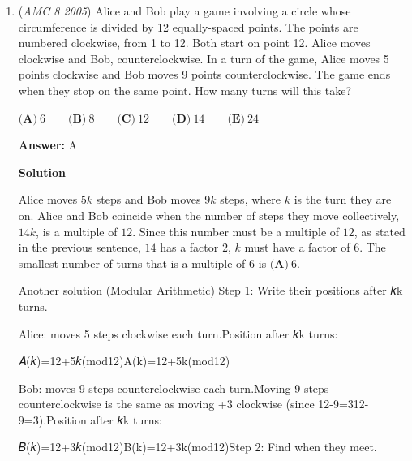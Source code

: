 \begin{enumerate}
$\textbf{(A)}\ 180\qquad\textbf{(B)}\ 188\qquad\textbf{(C)}\ 196\qquad\textbf{(D)}\ 200\qquad\textbf{(E)}\ 204$

 \textbf{Answer: }A



\textbf{Solution}

Draw altitudes from $B$ and $C$ to base $AD$ to create a rectangle and two right triangles. The side opposite $BC$ is equal to $50$. The bases of the right triangles can be found using Pythagorean or special triangles to be $18$ and $7$. Add it together to get $AD=18+50+7=75$. The perimeter is $75+30+50+25=\boxed{\textbf{(A)}\ 180}$.

 


	\item (\textit{AMC 8 2005}) Alice and Bob play a game involving a circle whose circumference is divided by 12 equally-spaced points. The points are numbered clockwise, from 1 to 12. Both start on point 12. Alice moves clockwise and Bob, counterclockwise.
In a turn of the game, Alice moves 5 points clockwise and Bob moves 9 points counterclockwise. The game ends when they stop on the same point. How many turns will this take?


 $\textbf{(A)}\ 6\qquad\textbf{(B)}\ 8\qquad\textbf{(C)}\ 12\qquad\textbf{(D)}\ 14\qquad\textbf{(E)}\ 24$

 \textbf{Answer: }A



\textbf{Solution}

Alice moves $5k$ steps and Bob moves $9k$ steps, where $k$ is the turn they are on. Alice and Bob coincide when the number of steps they move collectively, $14k$, is a multiple of $12$. Since this number must be a multiple of $12$, as stated in the previous sentence, $14$ has a factor $2$, $k$ must have a factor of $6$. The smallest number of turns that is a multiple of $6$ is $\boxed{\textbf{(A)}\ 6}$.

 Another solution (Modular Arithmetic) Step 1: Write their positions after 𝑘k turns.

 Alice: moves 5 steps clockwise each turn.Position after 𝑘k turns:

 𝐴(𝑘)=12+5𝑘(mod12)A(k)=12+5k(mod12)

 Bob: moves 9 steps counterclockwise each turn.Moving 9 steps counterclockwise is the same as moving +3 clockwise (since 12-9=312-9=3).Position after 𝑘k turns:

 𝐵(𝑘)=12+3𝑘(mod12)B(k)=12+3k(mod12)Step 2: Find when they meet.


\end{enumerate}
